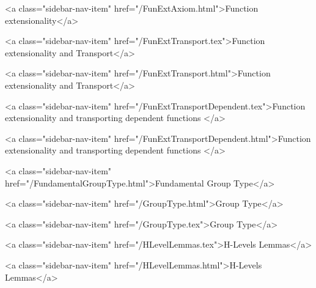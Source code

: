       
    
      
        
          <a class="sidebar-nav-item" href="/FunExtAxiom.html">Function extensionality</a>
        
      
    
      
        
          <a class="sidebar-nav-item" href="/FunExtTransport.tex">Function extensionality and Transport</a>
        
      
    
      
        
          <a class="sidebar-nav-item" href="/FunExtTransport.html">Function extensionality and Transport</a>
        
      
    
      
        
          <a class="sidebar-nav-item" href="/FunExtTransportDependent.tex">Function extensionality and transporting dependent functions </a>
        
      
    
      
        
          <a class="sidebar-nav-item" href="/FunExtTransportDependent.html">Function extensionality and transporting dependent functions </a>
        
      
    
      
        
          <a class="sidebar-nav-item" href="/FundamentalGroupType.html">Fundamental Group Type</a>
        
      
    
      
        
          <a class="sidebar-nav-item" href="/GroupType.html">Group Type</a>
        
      
    
      
        
          <a class="sidebar-nav-item" href="/GroupType.tex">Group Type</a>
        
      
    
      
        
          <a class="sidebar-nav-item" href="/HLevelLemmas.tex">H-Levels Lemmas</a>
        
      
    
      
        
          <a class="sidebar-nav-item" href="/HLevelLemmas.html">H-Levels Lemmas</a>
        
      
    
